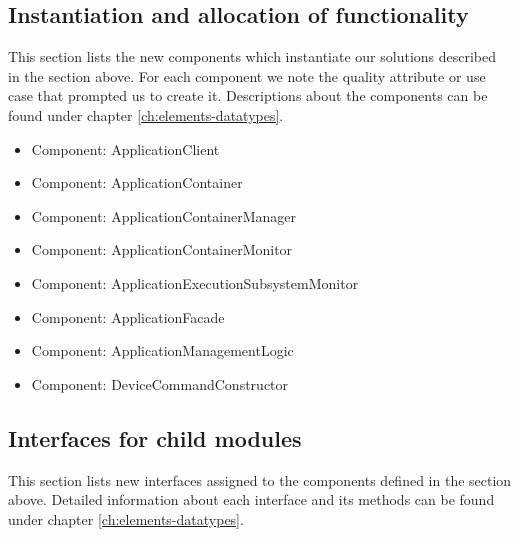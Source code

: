 
\subsection{Instantiation and allocation of functionality}
    This section lists the new components which instantiate our solutions
    described in the section above. For each component we note the quality
    attribute or use case that prompted us to create it. Descriptions about
    the components can be found under chapter \ref{ch:elements-datatypes}. \\

    \begin{itemize}
        \item Component: ApplicationClient
        \item Component: ApplicationContainer
        \item Component: ApplicationContainerManager
        \item Component: ApplicationContainerMonitor
        \item Component: ApplicationExecutionSubsystemMonitor
        \item Component: ApplicationFacade
        \item Component: ApplicationManagementLogic
        \item Component: DeviceCommandConstructor
    \end{itemize}

\subsection{Interfaces for child modules}
    This section lists new interfaces assigned to the components defined
    in the section above. Detailed information about each interface and
    its methods can be found under chapter \ref{ch:elements-datatypes}.

